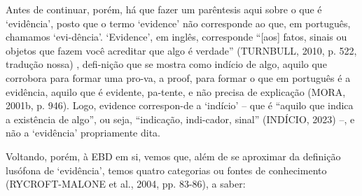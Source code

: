 \documentclass[twoside, 12pt]{book}
\begin{document}
        Antes de continuar, porém, há que fazer um parêntesis aqui sobre o que é ‘evidência’, posto que o termo ‘evidence’ não corresponde ao que, em português, chamamos ‘evi-dência’. ‘Evidence’, em inglês, corresponde “[aos] fatos, sinais ou objetos que fazem você acreditar que algo é verdade” (TURNBULL, 2010, p. 522, tradução nossa) , defi-nição que se mostra como indício de algo, aquilo que corrobora para formar uma pro-va, a proof, para formar o que em português é a evidência, aquilo que é evidente, pa-tente, e não precisa de explicação (MORA, 2001b, p. 946).  Logo, evidence correspon-de a ‘indício’ – que é “aquilo que indica a existência de algo”, ou seja, “indicação, indi-cador, sinal” (INDÍCIO, 2023) –, e não a ‘evidência’ propriamente dita.

        Voltando, porém, à EBD em si, vemos que, além de se aproximar da definição lusófona de ‘evidência’, temos quatro categorias ou fontes de conhecimento (RYCROFT-MALONE et al., 2004, pp. 83-86),  a saber:
\end{document}

